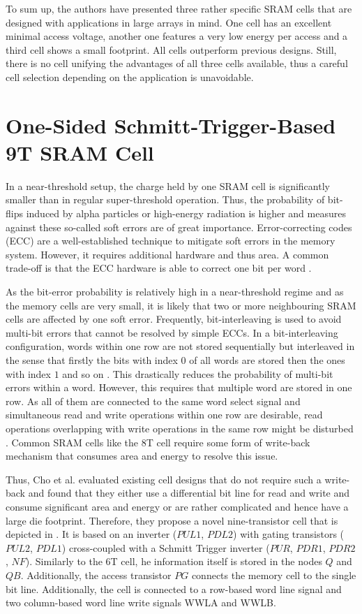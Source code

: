 \documentclass[conference]{IEEEtran}
\begin{document}
To sum up, the authors have presented three rather specific SRAM cells that are designed with applications in large arrays in mind. One cell has an excellent minimal access voltage, another one features a very low energy per access and a third cell shows a small footprint. All cells outperform previous designs. Still, there is no cell unifying the advantages of all three cells available, thus a careful cell selection depending on the application is unavoidable.

\section{One-Sided Schmitt-Trigger-Based 9T SRAM Cell} \label{sec:paper2}

In a near-threshold setup, the charge held by one SRAM cell is significantly smaller than in regular super-threshold operation. Thus, the probability of bit-flips induced by alpha particles or high-energy radiation is higher and measures against these so-called soft errors are of great importance. Error-correcting codes (ECC) are a well-established technique to mitigate soft errors in the memory system. However, it requires additional hardware and thus area. A common trade-off is that the ECC hardware is able to correct one bit per word \cite{Nayak2018}.

As the bit-error probability is relatively high in a near-threshold regime and as the memory cells are very small, it is likely that two or more neighbouring SRAM cells are affected by one soft error. Frequently, bit-interleaving is used to avoid multi-bit errors that cannot be resolved by simple ECCs. In a bit-interleaving configuration, words within one row are not stored sequentially but interleaved in the sense that firstly the bits with index $0$ of all words are stored then the ones with index $1$ and so on \cite{Nayak2018}. This drastically reduces the probability of multi-bit errors within a word. However, this requires that multiple word are stored in one row. As all of them are connected to the same word select signal and simultaneous read and write operations within one row are desirable, read operations overlapping with write operations in the same row might be disturbed \cite{Cho2020}. Common SRAM cells like the 8T cell require some form of write-back mechanism that consumes area and energy to resolve this issue.

Thus, Cho et al. \cite{Cho2020} evaluated existing cell designs that do not require such a write-back and found that they either use a differential bit line for read and write and consume significant area and energy or are rather complicated and hence have a large die footprint. Therefore, they propose a novel nine-transistor cell that is depicted in . It is based on an inverter ($PUL1$, $PDL2$) with gating transistors ($PUL2$, $PDL1$) cross-coupled with a Schmitt Trigger inverter ($PUR$, $PDR1$, $PDR2$, $NF$). Similarly to the 6T cell, he information itself is stored in the nodes $Q$ and $QB$. Additionally, the access transistor $PG$ connects the memory cell to the single bit line. Additionally, the cell is connected to a row-based word line signal and two column-based word line write signals WWLA and WWLB.
\end{document}
